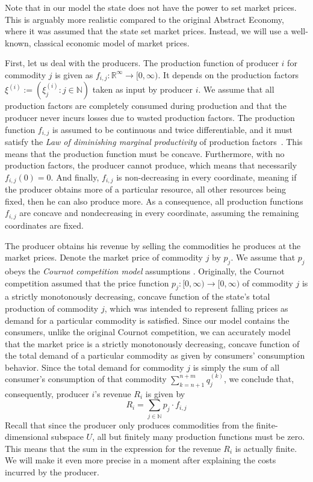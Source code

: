 \documentclass[a4paper,11pt,reqno,english]{amsart}
\theoremstyle{plain}
\theoremstyle{definition}
\begin{document}
Note that in our model the state does not have the power to set market prices. This is arguably more realistic compared to the original Abstract Economy, where it was assumed that the state set market prices. Instead, we will use a well-known, classical economic model of market prices.

\medskip
First, let us deal with the producers.
The production function of producer $i$ for commodity $j$ is given as $f_{i,j}\colon \mathbb{R}^{\infty}\longrightarrow[0,\infty)$.
It depends on the production factors $\xi^{(i)}:=(\xi_{j}^{(i)} : j\in\mathbb{N})$ taken as input by producer $i$.
We assume that all production factors are completely consumed during production and that the producer never incurs losses due to wasted production factors.
The production function $f_{i,j}$ is assumed to be continuous and twice differentiable, and it must satisfy the \emph{Law of diminishing marginal productivity} of production factors~\cite[Sec.\,3.1]{HendersonQuandt1958}.
This means that the production function must be concave.
Furthermore, with no production factors, the producer cannot produce, which means that necessarily $f_{i,j}(0)=0$. And finally, $f_{i,j}$ is non-decreasing in every coordinate, meaning if the producer obtains more of a particular resource, all other resources being fixed, then he can also produce more.
As a consequence, all production functions $f_{i,j}$ are concave and nondecreasing in every coordinate, assuming the remaining coordinates are fixed.

\medskip
The producer obtains his revenue by selling the commodities he produces at the market prices.
Denote the market price of commodity $j$ by $p_j$. We assume that $p_j$ obeys the \emph{Cournot competition model} assumptions \cite[Sec.\,6.2]{HendersonQuandt1958}.
Originally, the Cournot competition assumed that the price function $p_j\colon[0,\infty)\longrightarrow[0,\infty)$ of commodity $j$ is a strictly monotonously decreasing, concave function of the state's total production of commodity $j$, which was intended to represent falling prices as demand for a particular commodity is satisfied.
Since our model contains the consumers, unlike the original Cournot competition, we can accurately model that the market price is a strictly monotonously decreasing, concave function of the total demand of a particular commodity as given by consumers' consumption behavior. Since the total demand for commodity $j$ is simply the sum of all consumer's consumption of that commodity $\sum_{k=n+1}^{n+m} q^{(k)}_j$, we conclude that, consequently, producer $i$'s revenue $R_i$ is given by
\begin{displaymath}
	R_i = \sum_{j\in\mathbb{N}} p_j\cdot f_{i,j}
\end{displaymath}
Recall that since the producer only produces commodities from the finite-dimensional subspace $U$, all but finitely many production functions must be zero. This means that the sum in the expression for the revenue $R_i$ is actually finite. We will make it even more precise in a moment after explaining the costs incurred by the producer.
\end{document}
